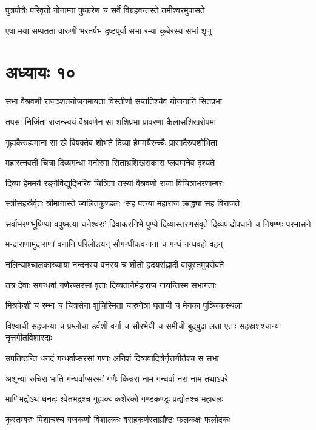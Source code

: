 \twolineshloka
{पुत्रपौत्रैः परिवृतो गोनाम्ना पुष्करेण च}
{सर्वे विग्रहवन्तस्ते तमीश्वरमुपासते}


\twolineshloka
{एषा मया सम्पतता वारुणी भरतर्षभ}
{दृष्टपूर्वा सभा रम्या कुबेरस्य सभां शृणु}


\chapter{अध्यायः १०}
\twolineshloka
{सभा वैश्रवणी राजञ्शतयोजनमायता}
{विस्तीर्णा सप्ततिश्चैव योजनानि सितप्रभा}


\twolineshloka
{तपसा निर्जिता राजन्स्वयं वैश्रवणेन सा}
{शशिप्रभा प्रावरणा कैलासशिखरोपमा}


\twolineshloka
{गुह्यकैरुह्यमाना सा खे विषक्तेव शोभते}
{दिव्या हेममयैरुच्चैः प्रासादैरुपशोभिता}


\threelineshloka
{महारत्नवती चित्रा दिव्यगन्धा मनोरमा}
{सिताभ्रशिखराकारा प्लवमानेव दृश्यते}
{}


\twolineshloka
{दिव्या हेममयै रङ्गैर्विद्युद्भिरिव चित्रिता}
{तस्यां वैश्रवणो राजा विचित्राभरणाम्बरः}


\threelineshloka
{स्त्रीसहस्रैर्वृतः श्रीमानास्ते ज्वलितकुण्डलः}
{`सह पत्न्या महाराज ऋद्ध्या सह विराजते}
{}


\threelineshloka
{सर्वाभरणभूषिण्या वपुष्मत्या धनेश्वरः'}
{दिवाकरनिभे पुण्ये दिव्यास्तरणसंवृते}
{दिव्यपादोपधाने च निषण्णः परमासने}


\twolineshloka
{मन्दाराणामुदाराणां वनानि परिलोडयन्}
{सौगन्धीकवनानां च गन्धं गन्धवहो वहन्}


\twolineshloka
{नलिन्याश्चालकाख्याया नन्दनस्य वनस्य च}
{शीतो हृदयसंह्लादी वायुस्तमुपसेवते}


\twolineshloka
{तत्र देवाः सगन्धर्वा गणैरप्सरसां वृताः}
{दिव्यतानैर्महाराज गायन्तिस्म सभागताः}


\twolineshloka
{मिश्रकेशी च रम्भा च चित्रसेना शुचिस्मिता}
{चारुनेत्रा घृताची च मेनका पुञ्जिकस्थला}


विश्वाची सहजन्या च प्रम्लोचा उर्वशी
\twolineshloka
{वर्गा च सौरभेयी च समीची बुद्बुदा लता}
{एताः सहस्रशश्चान्या नृत्तगीतविशारदाः}


\twolineshloka
{उपतिष्ठन्ति धनदं गन्धर्वाप्सरसां गणाः}
{अनिशं दिव्यवादित्रैर्नृत्तगीतैश्च स सभा}


\twolineshloka
{अशून्या रुचिरा भाति गन्धर्वाप्सरसां गणैः}
{किन्नरा नाम गन्धर्वा नरा नाम तथाऽपरे}


\twolineshloka
{माणिभद्रोऽथ धनदः श्वेतभद्रश्च गुह्यकः}
{कशेरको गण्डकण्डूः प्रद्योतश्च महाबलः}


\twolineshloka
{कुस्तम्बरुः पिशाचश्च गजकर्णो विशालकः}
{वराहकर्णस्ताम्रौष्ठः फलकक्षः फलोदकः}


